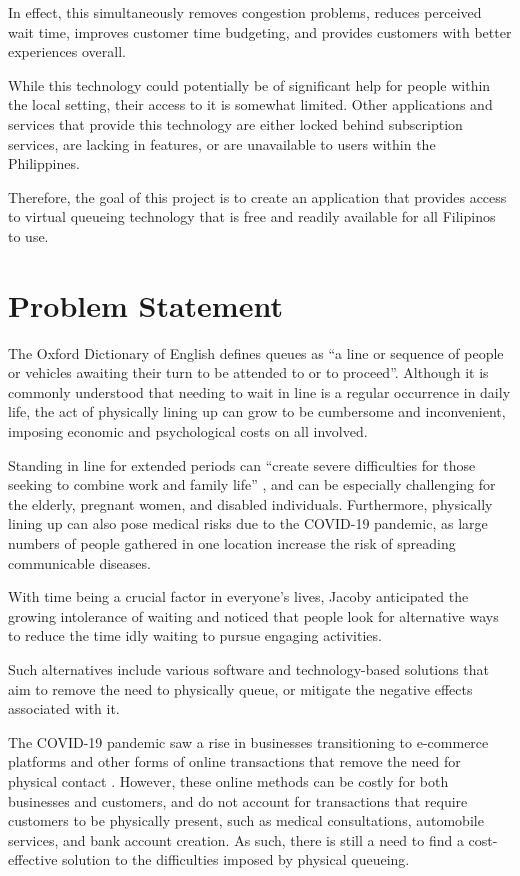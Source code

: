 In effect, this simultaneously removes congestion problems, reduces perceived wait time, improves customer time budgeting, and provides customers with better experiences overall.

While this technology could potentially be of significant help for people within the local setting, their access to it is somewhat limited. Other applications and services that provide this technology are either locked behind subscription services, are lacking in features, or are unavailable to users within the Philippines.

Therefore, the goal of this project is to create an application that provides access to virtual queueing technology that is free and readily available for all Filipinos to use.


\section{Problem Statement}

The Oxford Dictionary of English \citeyear{OxfordDictionary2022} defines queues as “a line or sequence of people or vehicles awaiting their turn to be attended to or to proceed”. Although it is commonly understood that needing to wait in line is a regular occurrence in daily life, the act of physically lining up can grow to be cumbersome and inconvenient, imposing economic and psychological costs on all involved.

Standing in line for extended periods can “create severe difficulties for those seeking to combine work and family life” \cite{Bittman2000}, and can be especially challenging for the elderly, pregnant women, and disabled individuals. Furthermore, physically lining up can also pose medical risks due to the COVID-19 pandemic, as large numbers of people gathered in one location increase the risk of spreading communicable diseases.

With time being a crucial factor in everyone's lives, Jacoby \citeyear{Jacoby1974} anticipated the growing intolerance of waiting and noticed that people look for alternative ways to reduce the time idly waiting to pursue engaging activities.

Such alternatives include various software and technology-based solutions that aim to remove the need to physically queue, or mitigate the negative effects associated with it.

The COVID-19 pandemic saw a rise in businesses transitioning to e-commerce platforms and other forms of online transactions that remove the need for physical contact \cite{alfonso2021commerce}. However, these online methods can be costly for both businesses and customers, and do not account for transactions that require customers to be physically present, such as medical consultations, automobile services, and bank account creation. As such, there is still a need to find a cost-effective solution to the difficulties imposed by physical queueing.

